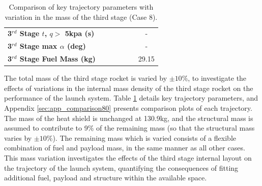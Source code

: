 \begin{table}[ht]
\begin{tabular}{l c c c c c c}
		\textbf{3$^{rd}$ Stage $t$, $q >$ 5kpa (s)}
		& \thirdqOverFivemThreeNinetyNoReturn
		& \thirdqOverFivemThreeNinetyFiveNoReturn
		& \thirdqOverFivemThreeStandardNoReturn
		& \thirdqOverFivemThreeOneHundredFiveNoReturn
		& \thirdqOverFivemThreeOneHundredTenNoReturn
		& -
		\\
		\textbf{3$^{rd}$ Stage max $\alpha$ (deg)}
		& \thirdmaxAoAmThreeNinetyNoReturn
		& \thirdmaxAoAmThreeNinetyFiveNoReturn
		& \thirdmaxAoAmThreeStandardNoReturn
		& \thirdmaxAoAmThreeOneHundredFiveNoReturn
		& \thirdmaxAoAmThreeOneHundredTenNoReturn
		& -
		\\
		\textbf{3$^{rd}$ Stage Fuel Mass (kg)}
		& \thirdmFuelmThreeNinetyNoReturn
		& \thirdmFuelmThreeNinetyFiveNoReturn
		& \thirdmFuelmThreeStandardNoReturn
		& \thirdmFuelmThreeOneHundredFiveNoReturn
		& \thirdmFuelmThreeOneHundredTenNoReturn
		&29.15
		\\
		\hline 
	\end{tabular} 
	\caption{Comparison of key trajectory parameters with variation in the mass of the third stage (Case 8).}
	\label{tab:comparison80}
\end{table}


The total mass of the third stage rocket is varied by $\pm10\%$, to investigate the effects of variations in the internal mass density of the third stage rocket on the performance of the launch system. Table \ref{tab:comparison80} details key trajectory parameters, and Appendix \ref{sec:app_comparison80} presents comparison plots of each trajectory.
The mass of the heat shield is unchanged at 130.9kg, and the structural mass is assumed to contribute to 9\% of the remaining mass (so that the structural mass varies by $\pm10\%$). The remaining mass which is varied consists of a flexible combination of fuel and payload mass, in the same manner as all other cases. 
This mass variation investigates the effects of the third stage internal layout on the trajectory of the launch system, quantifying the consequences of fitting additional fuel, payload and structure within the available space.

